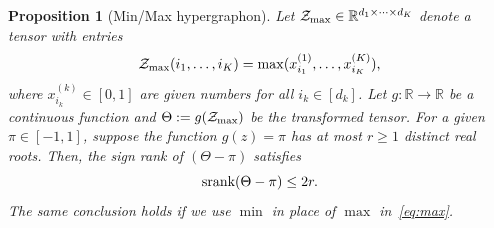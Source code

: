 \documentclass[11pt]{article}
\theoremstyle{plain}
\newtheorem{prop}{Proposition}
\theoremstyle{definition}
\def\srank{\textup{srank}}
\begin{document}
\begin{prop}[Min/Max hypergraphon] Let $\mathcal{Z}_{\max}\in\mathbb{R}^{d_1\times \cdots \times d_K}$ denote a tensor with entries 
\begin{equation}\label{eq:max}
\mathcal{Z}_{\max}(i_1,\ldots,i_K)=\max(x^{(1)}_{i_1},\ldots,x^{(K)}_{i_K}),
\end{equation}
where $x^{(k)}_{i_k}\in[0,1]$ are given numbers for all $i_k\in[d_k]$. Let $g\colon \mathbb{R}\to \mathbb{R}$ be a continuous function and $\Theta:=g(\mathcal{Z}_{\max})$ be the transformed tensor. For a given $\pi\in[-1,1]$, suppose the function $g(z)=\pi$ has at most $r\geq 1$ distinct real roots. Then, the sign rank of $(\Theta-\pi)$ satisfies
\[
\srank(\Theta-\pi)\leq 2r.
\]
The same conclusion holds if we use $\min$ in place of $\max$ in~\eqref{eq:max}. 
\end{prop}
\end{document}
